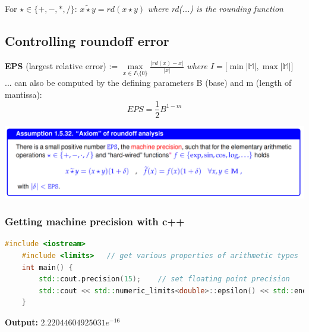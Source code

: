\documentclass[12pt, a4paper]{article}
\newcommand{\M}{\mathbb{M}}
\begin{document}
\begin{tcolorbox}
\hspace{3mm}	
	For $\star \in \lbrace +, -, *, / \rbrace$: \quad $x \widetilde{\star} y = rd(x \star y)$  \quad \textit{where rd(...) is the rounding function} 
\hspace{3mm}	
\end{tcolorbox}
\hspace{3mm}	

\subsection{Controlling roundoff error}	
\textbf{EPS} (largest relative error) := $\max\limits_{x \in I\setminus \lbrace 0 \rbrace} \frac{|rd(x) - x|}{|x|}$ \quad \textit{where $I = \lbrack \min |\M|, \max |\M| \rbrack$}
\\

... can also be computed by the defining parameters B (base) and m (length of mantissa): \\
\begin{equation*}
		EPS = \frac{1}{2} B^{1-m}
\end{equation*}
		
\begin{center}
	\includegraphics[width=1.0\textwidth]{axiom_roundoff_analysis.png}
\end{center}
	
\subsubsection{Getting machine precision with c++}
\begin{lstlisting}[language=C++]
	#include <iostream>
	#include <limits> 	// get various properties of arithmetic types
	int main() {
		std::cout.precision(15); 	// set floating point precision
		std::cout << std::numeric_limits<double>::epsilon() << std::endl;
	}
\end{lstlisting}

\textbf{Output:} \quad $2.22044604925031e^{-16}$ \\
\pagebreak
\end{document}
